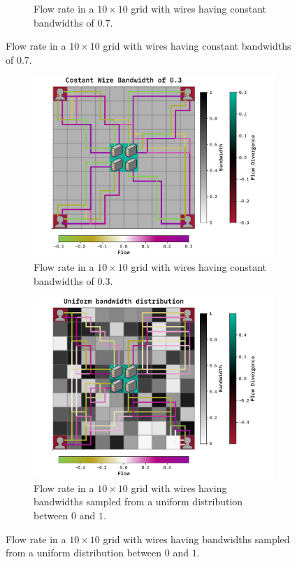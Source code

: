 \documentclass[10pt, titlepage, a4paper]{article}
\begin{document}
\begin{figure}[H]
\begin{subfigure}[t]{0.45\textwidth}
        \caption{Flow rate in a $10\times 10$ grid with wires having constant bandwidths of $0.7$.}
        \label{fig:ar1-const}
    \end{subfigure}
\end{figure}

\begin{figure}[H]
    \centering
    \begin{subfigure}[t]{0.45\textwidth}
        \includegraphics[width=\textwidth]{../Images/arbitrary-1-constant-sub.pdf}
        \caption{Flow rate in a $10\times 10$ grid with wires having constant bandwidths of $0.3$.}
        \label{fig:ar1-const-sub}
    \end{subfigure}\hspace{1.0cm}
    \begin{subfigure}[t]{0.45\textwidth}
        \includegraphics[width=\textwidth]{../Images/arbitrary-1-uniform.pdf}
        \caption{Flow rate in a $10\times 10$ grid with wires having bandwidths sampled from a uniform distribution between $0$ and $1$.}
        \label{fig:ar1-uniform}
    \end{subfigure}
\end{figure}
\end{document}
